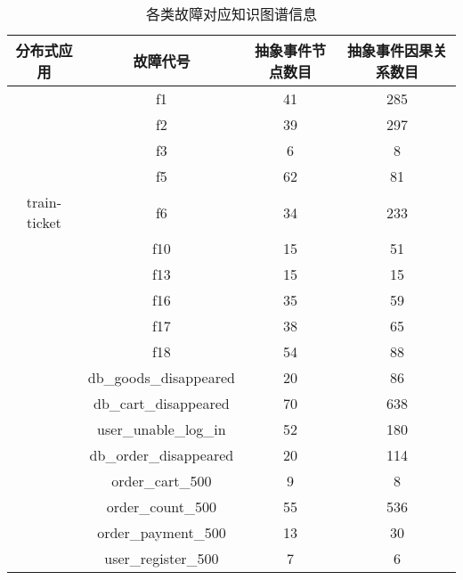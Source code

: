 \begin{table}[htbp]
    \caption{各类故障对应知识图谱信息}
    \centering
    \label{kg-abstract-event-num}
    \begin{tabular}{cccc}
    \toprule
    分布式应用          & 故障代号                                    & 抽象事件节点数目 & 抽象事件因果关系数目 \\ \midrule
                 & f1                                      & 41       & 285        \\
                 & f2                                      & 39       & 297        \\
                 & f3                                      & 6        & 8          \\
                 & f5                                      & 62       & 81         \\
    train-ticket & f6                                      & 34       & 233        \\
                 & f10                                     & 15       & 51         \\
                 & f13                                     & 15       & 15         \\
                 & f16                                     & 35       & 59         \\
                 & f17                                     & 38       & 65         \\
                 & f18                                     & 54       & 88         \\ \midrule
                 & db\_goods\_disappeared                  & 20       & 86         \\
                 & db\_cart\_disappeared                   & 70       & 638        \\
                 & user\_unable\_log\_in                   & 52       & 180        \\
                 & db\_order\_disappeared                  & 20       & 114        \\
                 & order\_cart\_500                        & 9        & 8          \\
                 & order\_count\_500                       & 55       & 536        \\
                 & order\_payment\_500                     & 13       & 30         \\
                 & user\_register\_500                     & 7        & 6          \\

\end{tabular}
\end{table}
